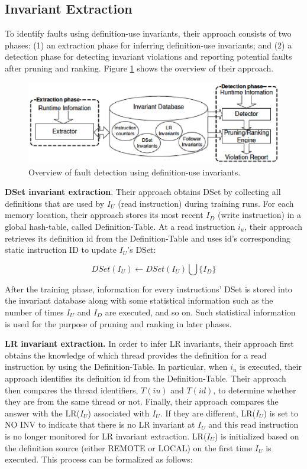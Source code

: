 \subsection{Invariant Extraction}
To identify faults using definition-use invariants, their approach consists of two phases: (1) an extraction phase for inferring definition-use invariants; and (2) a detection phase for detecting invariant violations and reporting potential faults after pruning and ranking. Figure \ref{fig:overview} shows the overview of their approach.

\begin{figure}[b]
\centering
\includegraphics[scale=0.6,clip]{fig/overview.eps} 
\caption{\label{fig:overview}Overview of fault detection using definition-use invariants.} 
\end{figure}

\textbf{DSet invariant extraction}. Their approach obtains DSet by collecting all definitions that are used
by $I_U$ (read instruction) during training runs. For each memory location, their approach stores its most recent $I_D$ (write instruction) in a global hash-table, called Definition-Table. At a read instruction $i_u$, their approach retrieves its definition id from the Definition-Table and uses id's corresponding static instruction ID to update $I_U$'s DSet:

$$ DSet(I_U) \leftarrow DSet(I_U) \bigcup \{I_D\}$$

After the training phase, information for every instructions' DSet is stored into the invariant database along with some statistical information such as the number of times $I_U$ and $I_D$ are executed, and so on. Such statistical information is used for the purpose of pruning and ranking in later phases.

\textbf{LR invariant extraction.} In order to infer LR invariants, their approach first obtains the knowledge of which thread provides the definition for a read instruction by using the Definition-Table. In particular, when $i_u$ is executed, their approach identifies its definition id from the Definition-Table. Their approach then compares the thread identifiers, $T(iu)$ and $T(id)$, to determine whether they are from the same thread or not. Finally, their approach compares the answer with the LR($I_U$) associated with $I_U$. If they are different, LR($I_U$) is set to NO INV to indicate that there is no LR invariant at $I_U$ and this read instruction is no longer monitored for LR invariant extraction. LR($I_U$) is initialized based on the
definition source (either REMOTE or LOCAL) on the first time $I_U$ is executed. This process can be formalized as follows:

